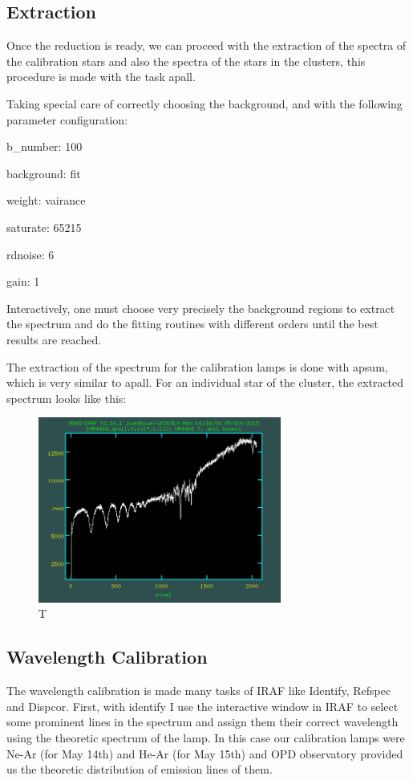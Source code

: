 \subsection{Extraction}

Once the reduction is ready, we can proceed with the extraction of the spectra of the calibration stars and also the spectra of the stars in the clusters, this procedure is made with the task apall.

Taking special care of correctly choosing the background, and with the following parameter configuration:

b\_number: 100

background: fit

weight: vairance

saturate: 65215

rdnoise: 6

gain: 1

Interactively, one must choose very precisely the background regions to extract the spectrum and do the fitting routines with different orders until the best results are reached.

The extraction of the spectrum for the calibration lamps is done with apsum, which is very similar to apall. For an individual star of the cluster, the extracted spectrum looks like this:

\begin{figure}[h]
\centering
\includegraphics[width=8cm]{images/calib_star_apall.png}
\caption{T}
\end{figure}

\subsection{Wavelength Calibration}

The wavelength calibration is made many tasks of IRAF like Identify, Refspec and Dispcor. First, with identify I use the interactive window in IRAF to select some prominent lines in the spectrum and assign them their correct wavelength using the theoretic spectrum of the lamp. In this case our calibration lamps were Ne-Ar (for May 14th) and He-Ar (for May 15th)  and OPD observatory provided us the theoretic distribution of emission lines of them.

